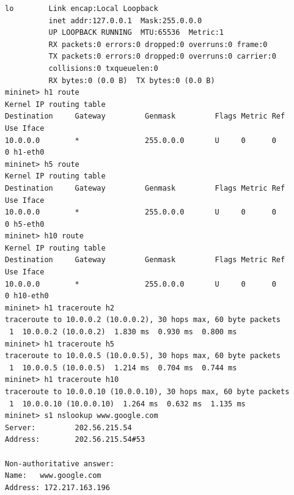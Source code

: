 \documentclass[a4paper, 11pt]{article}
\begin{document}
\begin{appendices}
\begin{lstlisting}[style=BashInputStyle]
lo        Link encap:Local Loopback
          inet addr:127.0.0.1  Mask:255.0.0.0
          UP LOOPBACK RUNNING  MTU:65536  Metric:1
          RX packets:0 errors:0 dropped:0 overruns:0 frame:0
          TX packets:0 errors:0 dropped:0 overruns:0 carrier:0
          collisions:0 txqueuelen:0
          RX bytes:0 (0.0 B)  TX bytes:0 (0.0 B)
mininet> h1 route
Kernel IP routing table
Destination     Gateway         Genmask         Flags Metric Ref    Use Iface
10.0.0.0        *               255.0.0.0       U     0      0        0 h1-eth0
mininet> h5 route
Kernel IP routing table
Destination     Gateway         Genmask         Flags Metric Ref    Use Iface
10.0.0.0        *               255.0.0.0       U     0      0        0 h5-eth0
mininet> h10 route
Kernel IP routing table
Destination     Gateway         Genmask         Flags Metric Ref    Use Iface
10.0.0.0        *               255.0.0.0       U     0      0        0 h10-eth0
mininet> h1 traceroute h2
traceroute to 10.0.0.2 (10.0.0.2), 30 hops max, 60 byte packets
 1  10.0.0.2 (10.0.0.2)  1.830 ms  0.930 ms  0.800 ms
mininet> h1 traceroute h5
traceroute to 10.0.0.5 (10.0.0.5), 30 hops max, 60 byte packets
 1  10.0.0.5 (10.0.0.5)  1.214 ms  0.704 ms  0.744 ms
mininet> h1 traceroute h10
traceroute to 10.0.0.10 (10.0.0.10), 30 hops max, 60 byte packets
 1  10.0.0.10 (10.0.0.10)  1.264 ms  0.632 ms  1.135 ms
mininet> s1 nslookup www.google.com
Server:         202.56.215.54
Address:        202.56.215.54#53

Non-authoritative answer:
Name:   www.google.com
Address: 172.217.163.196
\end{lstlisting}

\end{appendices}
\end{document}
